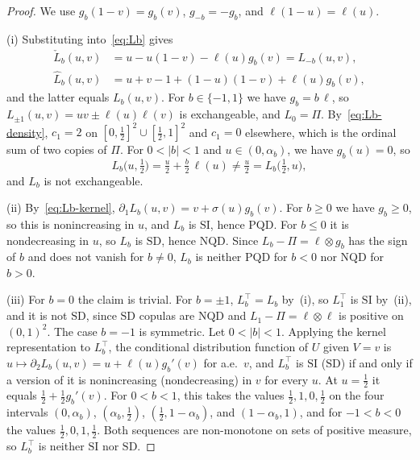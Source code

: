 \documentclass[twocolumn,a4paper]{article}
\numberwithin{equation}{section}
\theoremstyle{remark}
\newcommand{\1}{\mathbf{1}}
\newcommand{\PQD}{\mathrm{PQD}}
\newcommand{\NQD}{\mathrm{NQD}}
\newcommand{\SI}{\mathrm{SI}}
\newcommand{\SD}{\mathrm{SD}}
\begin{document}
\begin{proof}
We use \(g_b(1-v)=g_b(v)\), \(g_{-b}=-g_b\), and \(\ell(1-u)=\ell(u)\).

(i) Substituting into~\eqref{eq:Lb} gives
\begin{align*}
\check L_b(u,v)&=u-u(1-v)-\ell(u)g_b(v)=L_{-b}(u,v),\\
\widehat L_b(u,v)&=u+v-1+(1-u)(1-v)+\ell(u)g_b(v),
\end{align*}
and the latter equals \(L_b(u,v)\).
For \(b\in\{-1,1\}\) we have \(g_b=b\,\ell\), so \(L_{\pm1}(u,v)=uv\pm\ell(u)\ell(v)\) is exchangeable, and \(L_0=\Pi\).
By~\eqref{eq:Lb-density}, \(c_1=2\) on \([0,\tfrac12]^2\cup[\tfrac12,1]^2\) and \(c_1=0\) elsewhere, which is the ordinal sum of two copies of \(\Pi\).
For \(0<|b|<1\) and \(u\in(0,\alpha_b)\), we have \(g_b(u)=0\), so
\[
L_b\bigl(u,\tfrac12\bigr)=\tfrac u2+\tfrac b2\,\ell(u)\ne\tfrac u2=L_b\bigl(\tfrac12,u\bigr),
\]
and \(L_b\) is not exchangeable.

(ii) By~\eqref{eq:Lb-kernel}, \(\partial_1L_b(u,v)=v+\sigma(u)g_b(v)\).
For \(b\ge0\) we have \(g_b\ge0\), so this is nonincreasing in \(u\), and \(L_b\) is \(\SI\), hence \(\PQD\).
For \(b\le0\) it is nondecreasing in \(u\), so \(L_b\) is \(\SD\), hence \(\NQD\).
Since \(L_b-\Pi=\ell\otimes g_b\) has the sign of \(b\) and does not vanish for \(b\ne0\), \(L_b\) is neither \(\PQD\) for \(b<0\) nor \(\NQD\) for \(b>0\).

(iii) For \(b=0\) the claim is trivial.
For \(b=\pm1\), \(L_b^\top=L_b\) by~(i), so \(L_1^\top\) is \(\SI\) by~(ii), and it is not \(\SD\), since \(\SD\) copulas are \(\NQD\) and \(L_1-\Pi=\ell\otimes\ell\) is positive on \((0,1)^2\).
The case \(b=-1\) is symmetric.
Let \(0<|b|<1\).
Applying the kernel representation to \(L_b^\top\), the conditional distribution function of \(U\) given \(V=v\) is \(u\mapsto\partial_2L_b(u,v)=u+\ell(u)g_b'(v)\) for a.e.\ \(v\), and \(L_b^\top\) is \(\SI\) (\(\SD\)) if and only if a version of it is nonincreasing (nondecreasing) in \(v\) for every \(u\).
At \(u=\tfrac12\) it equals \(\tfrac12+\tfrac12g_b'(v)\).
For \(0<b<1\), this takes the values \(\tfrac12,1,0,\tfrac12\) on the four intervals \((0,\alpha_b)\), \((\alpha_b,\tfrac12)\), \((\tfrac12,1-\alpha_b)\), and \((1-\alpha_b,1)\), and for \(-1<b<0\) the values \(\tfrac12,0,1,\tfrac12\).
Both sequences are non-monotone on sets of positive measure, so \(L_b^\top\) is neither \(\SI\) nor \(\SD\).


\end{proof}
\end{document}
